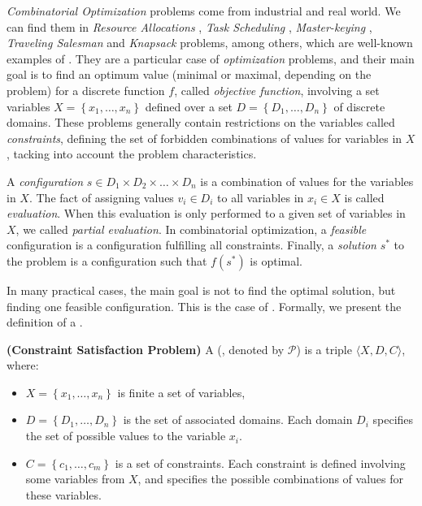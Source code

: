 \textit{Combinatorial Optimization} problems come from industrial and real world. We can find them in {\it Resource Allocations} \cite{Akplogan2011}, \textit{Task Scheduling} \cite{Sibbesen2008}, \textit{Master-keying} \cite{Espelage2000}, \textit{Traveling Salesman} and \textit{Knapsack} problems, among others, which are well-known examples of \cops{} \cite{Smith2005}. They are a particular case of \textit{optimization} problems, and their main goal is to find an optimum value (minimal or maximal, depending on the problem) for a discrete function $f$, called \textit{objective function}, involving a set variables $X = \left\{x_1, \dots, x_n\right\}$ defined over a set $D = \left\{D_1, \dots, D_n\right\}$ of discrete domains. These problems generally contain restrictions on the variables called \textit{constraints}, defining the set of forbidden combinations of values for variables in $X$, tacking into account the problem characteristics.

A \textit{configuration} $s\in D_1\times D_2\times\dots\times D_n$ is a combination of values for the variables in $X$. The fact of assigning values $v_i \in D_i$ to all variables in $x_i \in X$ is called \textit{evaluation}. When this evaluation is only performed to a given set of variables in $X$, we called \textit{partial evaluation}. In combinatorial optimization, a \textit{feasible} configuration is a configuration fulfilling all constraints. Finally, a \textit{solution} $s^*$ to the problem is a configuration such that $f(s^*)$ is optimal.

In many practical cases, the main goal is not to find the optimal solution, but finding one feasible configuration. This is the case of \CSPs. Formally, we present the definition of a \csp{}. 

\begin{definition}{\bf (Constraint Satisfaction Problem)}
\label{def:csp}
A \CSP{} (\csp, denoted by $\mathcal{P}$) is a triple $\langle X,D,C \rangle$, where:
\begin{itemize}
\item $X = \left\{x_1,\ldots,x_n\right\}$ is finite a set of variables,
\item $D = \left\{D_1,\ldots, D_n\right\}$ is the set of associated domains. Each domain $D_i$ specifies the set of possible values to the variable $x_i$. %
\item $C = \left\{c_1,\ldots, c_m\right\}$ is a set of constraints. Each constraint is defined involving some variables from $X$, and specifies the possible combinations of values for these variables.
\end{itemize}
\end{definition}

